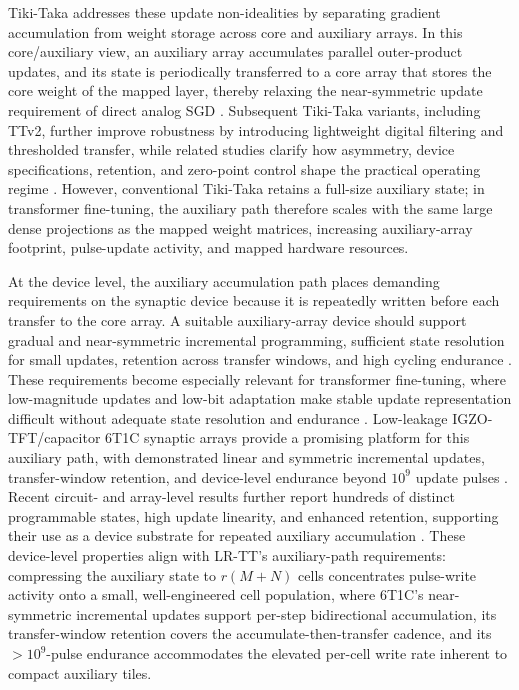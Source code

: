 \documentclass[AMA,LATO2COL]{WileyNJDv5}
\begin{document}
\noindent
Tiki-Taka addresses these update non-idealities by separating gradient accumulation from weight storage across core and auxiliary arrays.
In this core/auxiliary view, an auxiliary array accumulates parallel outer-product updates, and its state is periodically transferred to a core array that stores the core weight of the mapped layer, thereby relaxing the near-symmetric update requirement of direct analog SGD \cite{gokmen2020tikitaka,onen2022asymmetric}.
Subsequent Tiki-Taka variants, including TTv2, further improve robustness by introducing lightweight digital filtering and thresholded transfer, while related studies clarify how asymmetry, device specifications, retention, and zero-point control shape the practical operating regime \cite{gokmen2021ttv2,lee2022tikitaka_asymmetry,byun2024devicespec_tikitaka,stecconi2024nanolett_tikitaka,noh2024retention_zeroshifting,rasch2024fastrobust}.
However, conventional Tiki-Taka retains a full-size auxiliary state; in transformer fine-tuning, the auxiliary path therefore scales with the same large dense projections as the mapped weight matrices, increasing auxiliary-array footprint, pulse-update activity, and mapped hardware resources.

\noindent
At the device level, the auxiliary accumulation path places demanding requirements on the synaptic device because it is repeatedly written before each transfer to the core array.
A suitable auxiliary-array device should support gradual and near-symmetric incremental programming, sufficient state resolution for small updates, retention across transfer windows, and high cycling endurance \cite{gokmen2021ttv2,rasch2024fastrobust,won2023advs_6t1c}.
These requirements become especially relevant for transformer fine-tuning, where low-magnitude updates and low-bit adaptation make stable update representation difficult without adequate state resolution and endurance \cite{jeon2025l4q,zhou2025quzo,chen2025albertanalog}.
Low-leakage IGZO-TFT/capacitor 6T1C synaptic arrays provide a promising platform for this auxiliary path, with demonstrated linear and symmetric incremental updates, transfer-window retention, and device-level endurance beyond \(10^9\) update pulses \cite{won2023advs_6t1c}.
Recent circuit- and array-level results further report hundreds of distinct programmable states, high update linearity, and enhanced retention, supporting their use as a device substrate for repeated auxiliary accumulation \cite{kang2025jssc_6t1c,kang2025advs_disturbance,han2025acsami_gi}.
These device-level properties align with LR-TT's auxiliary-path requirements: compressing the auxiliary state to \(r(M+N)\) cells concentrates pulse-write activity onto a small, well-engineered cell population, where 6T1C's near-symmetric incremental updates support per-step bidirectional accumulation, its transfer-window retention covers the accumulate-then-transfer cadence, and its \(>10^9\)-pulse endurance accommodates the elevated per-cell write rate inherent to compact auxiliary tiles.
\end{document}
